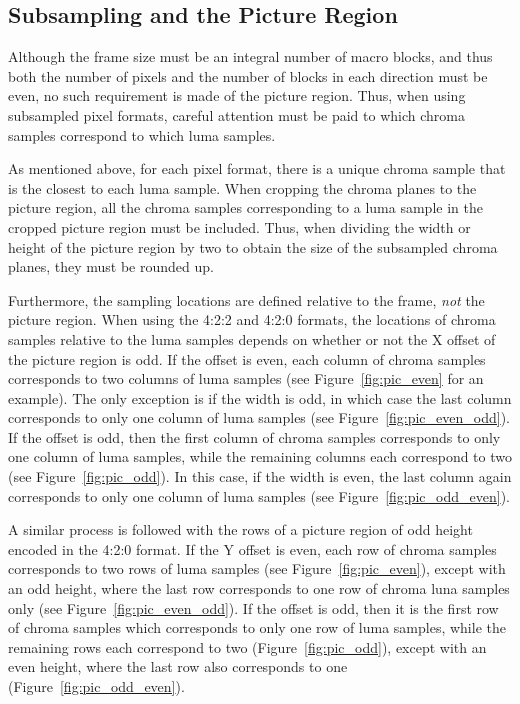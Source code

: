 \documentclass[9pt,letterpaper]{book}
\numberwithin{equation}{chapter}
\numberwithin{figure}{chapter}
\numberwithin{table}{chapter}
\begin{document}
%
%
%
%
%
%
%
%
%
%

\subsection{Subsampling and the Picture Region}

Although the frame size must be an integral number of macro blocks, and thus
 both the number of pixels and the number of blocks in each direction must be
 even, no such requirement is made of the picture region.
Thus, when using subsampled pixel formats, careful attention must be paid to
 which chroma samples correspond to which luma samples.

As mentioned above, for each pixel format, there is a unique chroma sample that
 is the closest to each luma sample.
When cropping the chroma planes to the picture region, all the chroma samples
 corresponding to a luma sample in the cropped picture region must be included.
Thus, when dividing the width or height of the picture region by two to obtain
 the size of the subsampled chroma planes, they must be rounded up.

Furthermore, the sampling locations are defined relative to the frame,
 {\em not} the picture region.
When using the 4:2:2 and 4:2:0 formats, the locations of chroma samples
 relative to the luma samples depends on whether or not the X offset of the
 picture region is odd.
If the offset is even, each column of chroma samples corresponds to two columns
 of luma samples (see Figure~\ref{fig:pic_even} for an example).
The only exception is if the width is odd, in which case the last column
 corresponds to only one column of luma samples (see Figure~\ref{fig:pic_even_odd}).
If the offset is odd, then the first column of chroma samples corresponds to
 only one column of luma samples, while the remaining columns each correspond
 to two (see Figure~\ref{fig:pic_odd}).
In this case, if the width is even, the last column again corresponds to only
 one column of luma samples (see Figure~\ref{fig:pic_odd_even}).

A similar process is followed with the rows of a picture region of odd height
 encoded in the 4:2:0 format.
If the Y offset is even, each row of chroma samples corresponds to two rows of
 luma samples (see Figure~\ref{fig:pic_even}), except with an odd height, where
 the last row corresponds to one row of chroma luna samples only (see 
 Figure~\ref{fig:pic_even_odd}).
If the offset is odd, then it is the first row of chroma samples which
 corresponds to only one row of luma samples, while the remaining rows each
 correspond to two (Figure~\ref{fig:pic_odd}), except with an even height, 
 where the last row also corresponds to one (Figure~\ref{fig:pic_odd_even}).
\end{document}
